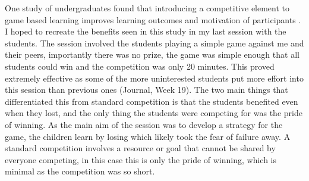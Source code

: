 \documentclass[11pt, a4paper, notitlepage]{article}
\begin{document}
One study of undergraduates found that introducing a competitive element to game based learning improves learning outcomes and motivation of participants \cite{Cagiltay:2015}. I hoped to recreate the benefits seen in this study in my last session with the students. The session involved the students playing a simple game against me and their peers, importantly there was no prize, the game was simple enough that all students could win and the competition was only 20 minutes. This proved extremely effective as some of the more uninterested students put more effort into this session than previous ones (Journal, Week 19). The two main things that differentiated this from standard competition is that the students benefited even when they lost, and the only thing the students were competing for was the pride of winning. As the main aim of the session was to develop a strategy for the game, the children learn by losing which likely took the fear of failure away. A standard competition involves a resource or goal that cannot be shared by everyone competing, in this case this is only the pride of winning, which is minimal as the competition was so short.
\par
\end{document}
